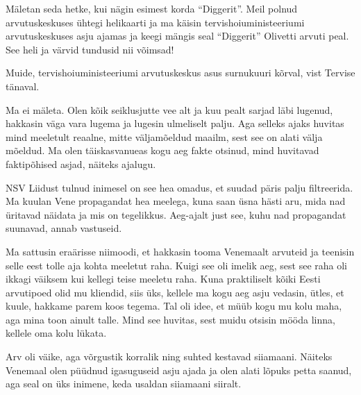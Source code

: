 Mäletan seda hetke, kui nägin esimest korda \enquote{Diggerit}. Meil polnud arvutuskeskuses ühtegi helikaarti ja ma käisin 
tervishoiuministeeriumi arvutuskeskuses asju ajamas ja 
keegi mängis seal \enquote{Diggerit} Olivetti arvuti peal. See heli ja värvid tundusid nii 
võimsad! 

Muide, tervishoiuministeeriumi arvutuskeskus asus 
surnukuuri kõrval, vist Tervise tänaval. 


Ma ei mäleta. Olen kõik seiklusjutte vee alt ja kuu pealt sarjad läbi 
lugenud, hakkasin väga vara lugema ja lugesin ulmeliselt palju. Aga 
selleks ajaks huvitas mind meeletult reaalne, mitte väljamõeldud maailm, sest see
on alati välja mõeldud. Ma olen täiskasvanueas kogu aeg fakte 
otsinud, mind huvitavad faktipõhised asjad, näiteks ajalugu. 


NSV Liidust tulnud inimesel on see hea omadus, et suudad päris palju 
filtreerida. Ma kuulan Vene propagandat hea meelega, kuna saan üsna hästi aru, mida nad üritavad näidata ja mis on 
tegelikkus. Aeg-ajalt just see, 
kuhu nad propagandat suunavad, annab vastuseid. 


Ma sattusin eraärisse niimoodi, et hakkasin tooma Venemaalt arvuteid ja 
teenisin selle eest tolle aja kohta meeletut raha. Kuigi see oli imelik aeg, sest
see raha oli ikkagi väiksem kui kellegi teise meeletu raha. Kuna 
praktiliselt kõiki Eesti arvutipoed olid mu kliendid, 
siis üks, kellele ma kogu aeg asju vedasin, ütles, et kuule, hakkame 
parem koos tegema. Tal oli
idee, et müüb kogu mu kolu maha, aga mina toon ainult talle. Mind see huvitas, sest muidu otsisin mööda linna, kellele oma 
kolu lükata. 


Arv oli väike, aga võrgustik korralik ning suhted kestavad 
siiamaani. Näiteks Venemaal olen püüdnud igasuguseid asju ajada ja olen alati 
lõpuks petta saanud, aga seal on üks inimene, keda usaldan siiamaani 
siiralt. 


